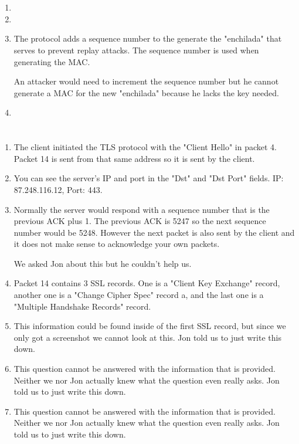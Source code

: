 \documentclass[12pt, a4paper]{article}
\begin{document}
\section{} %
\begin{enumerate}[a]
	\item %
	\item %
	\item %
	The protocol adds a sequence number to the generate the "enchilada" that serves to prevent replay attacks. The sequence number is used when generating the MAC.

	An attacker would need to increment the sequence number but he cannot generate a MAC for the new "enchilada" because he lacks the key needed.
	\item %
\end{enumerate}

\section{} %
\begin{enumerate}[a]
	\item %
	The client initiated the TLS protocol with the "Client Hello" in packet 4. Packet 14 is sent from that same address so it is sent by the client.
	\item %
	You can see the server's IP and port in the "Dst" and "Dst Port" fields. IP: 87.248.116.12, Port: 443.
	\item %
	Normally the server would respond with a sequence number that is the previous ACK plus 1. The previous ACK is 5247 so the next sequence number would be 5248. However the next packet is also sent by the client and it does not make sense to acknowledge your own packets.

	We asked Jon about this but he couldn't help us.
	\item %
	Packet 14 contains 3 SSL records. One is a "Client Key Exchange" record, another one is a "Change Cipher Spec" record a, and the last one is a "Multiple Handshake Records" record.
	\item %
	This information could be found inside of the first SSL record, but since we only got a screenshot we cannot look at this. Jon told us to just write this down.
	\item %
	This question cannot be answered with the information that is provided. Neither we nor Jon actually knew what the question even really asks. Jon told us to just write this down.
	\item %
	This question cannot be answered with the information that is provided. Neither we nor Jon actually knew what the question even really asks. Jon told us to just write this down.
\end{enumerate}
\end{document}
